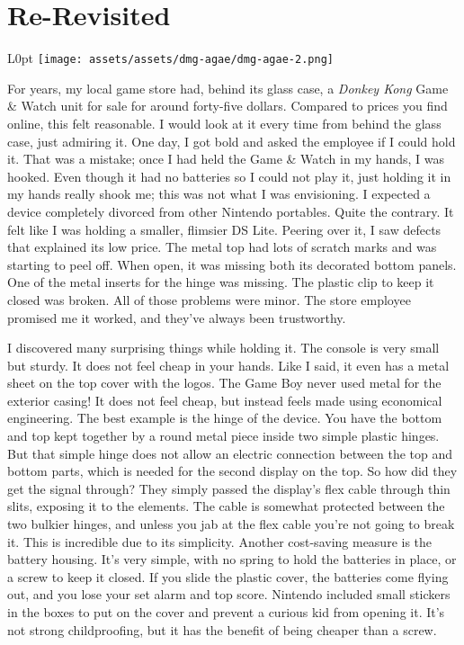\documentclass{book}
\begin{document}
\newpage\FloatBarrier\needspace{10mm}\section*{Re-Revisited}\nopagebreak[4]
\begin{wrapfigure}{L}{0pt} \texttt{[image: assets/assets/dmg-agae/dmg-agae-2.png]}\end{wrapfigure}
For years, my local game store had, behind its glass case, a \emph{Donkey Kong} Game \& Watch unit for sale for around forty-five dollars. Compared to prices you find online, this felt reasonable. I would look at it every time from behind the glass case, just admiring it. One day, I got bold and asked the employee if I could hold it. That was a mistake; once I had held the Game \& Watch in my hands, I was hooked. Even though it had no batteries so I could not play it, just holding it in my hands really shook me; this was not what I was envisioning. I expected a device completely divorced from other Nintendo portables. Quite the contrary. It felt like I was holding a smaller, flimsier DS Lite. Peering over it, I saw defects that explained its low price. The metal top had lots of scratch marks and was starting to peel off. When open, it was missing both its decorated bottom panels. One of the metal inserts for the hinge was missing. The plastic clip to keep it closed was broken. All of those problems were minor. The store employee promised me it worked, and they’ve always been trustworthy.

I discovered many surprising things while holding it. The console is very small but sturdy. It does not feel cheap in your hands. Like I said, it even has a metal sheet on the top cover with the logos. The Game Boy never used metal for the exterior casing! It does not feel cheap, but instead feels made using economical engineering. The best example is the hinge of the device. You have the bottom and top kept together by a round metal piece inside two simple plastic hinges. But that simple hinge does not allow an electric connection between the top and bottom parts, which is needed for the second display on the top. So how did they get the signal through? They simply passed the display’s flex cable through thin slits, exposing it to the elements. The cable is somewhat protected between the two bulkier hinges, and unless you jab at the flex cable you’re not going to break it. This is incredible due to its simplicity. Another cost-saving measure is the battery housing. It’s very simple, with no spring to hold the batteries in place, or a screw to keep it closed. If you slide the plastic cover, the batteries come flying out, and you lose your set alarm and top score. Nintendo included small stickers in the boxes to put on the cover and prevent a curious kid from opening it. It’s not strong childproofing, but it has the benefit of being cheaper than a screw.
\end{document}
